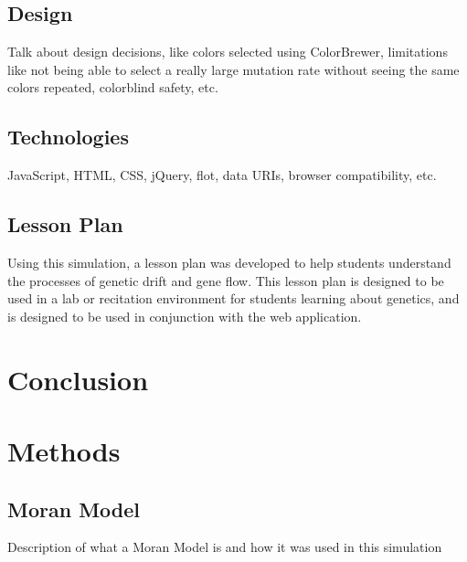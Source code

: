 \documentclass[12pt]{article}
\begin{document}
\begin{spacing}{1.5}
\subsection{Design}
Talk about design decisions, like colors selected using ColorBrewer, limitations like not being able to select a really large mutation rate without seeing the same colors repeated, colorblind safety, etc.
\subsection{Technologies}
JavaScript, HTML, CSS, jQuery, flot, data URIs, browser compatibility, etc.
\subsection{Lesson Plan}
Using this simulation, a lesson plan was developed to help students understand the processes of genetic drift and gene flow. This lesson plan is designed to be used in a lab or recitation environment for students learning about genetics, and is designed to be used in conjunction with the web application.

\section{Conclusion}

\section{Methods}
\subsection{Moran Model}
Description of what a Moran Model is and how it was used in this simulation

\end{spacing}
\end{document}
